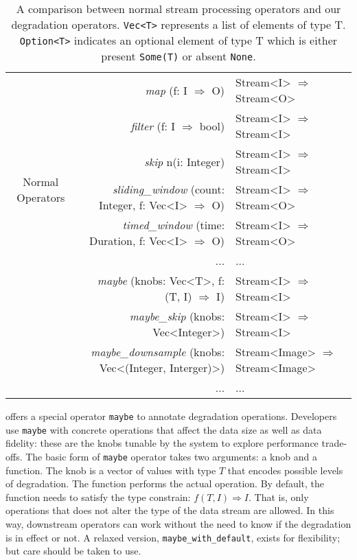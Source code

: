 \begin{table*}
  \centering
  \begin{tabular}{ c r l }
    \toprule
    \multirow{7}{*}{Normal Operators}
    & \textit{map} (f: I $\Rightarrow$ O) & Stream<I> $\Rightarrow$ Stream<O> \\
    & \textit{filter} (f: I $\Rightarrow$ bool) & Stream<I> $\Rightarrow$
                                                 Stream<I> \\
    & \textit{skip} n(i: Integer) & Stream<I> $\Rightarrow$ Stream<I> \\
    & \textit{sliding\_window} (count: Integer, f: Vec<I> $\Rightarrow$ O) & Stream<I> $\Rightarrow$
                                                                            Stream<O> \\
    & \textit{timed\_window} (time: Duration, f: Vec<I> $\Rightarrow$ O) & Stream<I> $\Rightarrow$
                                                                          Stream<O> \\
    & ... & ... \\
    \midrule
    \multirow{4}{*}{Degradation Operators}
    & \textit{maybe} (knobs: Vec<T>, f:  (T, I) $\Rightarrow$ I) & Stream<I> $\Rightarrow$
                                                                 Stream<I> \\
    & \textit{maybe\_skip} (knobs: Vec<Integer>) & Stream<I> $\Rightarrow$ Stream<I> \\
    & \textit{maybe\_downsample} (knobs: Vec<(Integer, Interger)>) & Stream<Image> $\Rightarrow$ Stream<Image> \\
    & ... & ... \\
    \bottomrule
  \end{tabular}
  \caption{A comparison between normal stream processing operators and our
    degradation operators. \texttt{Vec<T>} represents a list of elements of type
    T. \texttt{Option<T>} indicates an optional element of type T which is
    either present \texttt{Some(T)} or absent \texttt{None}.}
  \label{tab:operators}
\end{table*}

\sysname{} offers a special operator \texttt{maybe} to annotate degradation
operations. Developers use \texttt{maybe} with concrete operations that affect
the data size as well as data fidelity: these are the knobs tunable by the
system to explore performance trade-offs. The basic form of \texttt{maybe}
operator takes two arguments: a knob and a function. The knob is a vector of
values with type $T$ that encodes possible levels of degradation. The function
performs the actual operation. By default, the function needs to satisfy the
type constrain: $f(T, I) \Rightarrow I$. That is, only operations that does not
alter the type of the data stream are allowed. In this way, downstream operators
can work without the need to know if the degradation is in effect or not. A
relaxed version, \texttt{maybe\_with\_default}, exists for flexibility; but care
should be taken to use.


